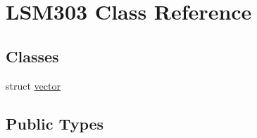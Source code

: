 \hypertarget{class_l_s_m303}{}\section{L\+S\+M303 Class Reference}
\label{class_l_s_m303}
\subsection*{Classes}
\begin{DoxyCompactItemize}
\item 
struct \hyperlink{struct_l_s_m303_1_1vector}{vector}
\end{DoxyCompactItemize}
\subsection*{Public Types}
